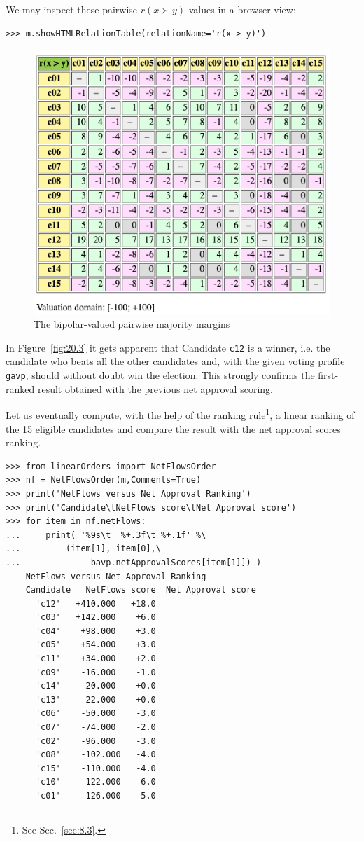 We may inspect these pairwise $r(x \succ y)$ values in a browser view: 
\begin{lstlisting}
>>> m.showHTMLRelationTable(relationName='r(x > y)')
\end{lstlisting}
\begin{figure}[ht]
\includegraphics[width=0.8\hsize]{Figures/20-3-majMargAV.png}
\caption{The bipolar-valued pairwise majority margins} 
\label{fig:20.3}       %
\end{figure}

In Figure~\vref{fig:20.3} it gets apparent that Candidate \texttt{c12} is a \Condorcet winner, i.e. the candidate who beats all the other candidates and, with the given voting profile \texttt{gavp}, should without doubt win the election. This strongly confirms the first-ranked result obtained with the previous net approval scoring. 

Let us eventually compute, with the help of the \NetFlows ranking rule\footnote{See Sec.~\ref{sec:8.3}.}, a linear ranking of the 15 eligible candidates and compare the result with the net approval scores ranking.
\begin{lstlisting}[caption={Comparing the net approval and the \NetFlows rankings},label=list:20.10]
>>> from linearOrders import NetFlowsOrder
>>> nf = NetFlowsOrder(m,Comments=True)
>>> print('NetFlows versus Net Approval Ranking')
>>> print('Candidate\tNetFlows score\tNet Approval score')
>>> for item in nf.netFlows:
...     print( '%9s\t  %+.3f\t %+.1f' %\
...	        (item[1], item[0],\
...              bavp.netApprovalScores[item[1]]) ) 
    NetFlows versus Net Approval Ranking
    Candidate	NetFlows score	Net Approval score
      'c12'	  +410.000	 +18.0
      'c03'	  +142.000	  +6.0
      'c04'	   +98.000	  +3.0
      'c05'	   +54.000	  +3.0
      'c11'	   +34.000	  +2.0
      'c09'	   -16.000	  -1.0
      'c14'	   -20.000	  +0.0
      'c13'	   -22.000	  +0.0
      'c06'	   -50.000	  -3.0
      'c07'	   -74.000	  -2.0
      'c02'	   -96.000	  -3.0
      'c08'	   -102.000	  -4.0
      'c15'	   -110.000	  -4.0
      'c10'	   -122.000	  -6.0
      'c01'	   -126.000	  -5.0
\end{lstlisting}

